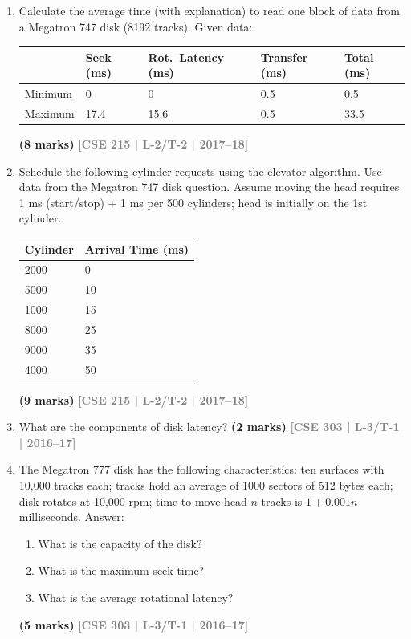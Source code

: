 \documentclass[12pt,a3paper]{article}
\newcommand{\yr}[1]{\hfill\textcolor{gray}{\small\textbf{[#1]}}}
\newcommand{\mk}[1]{\textcolor{orange!70!black}{\small\textbf{(#1 marks)}}}
\begin{document}
\begin{enumerate}
\item Calculate the average time (with explanation) to read one block of data from a Megatron 747 disk (8192 tracks). Given data:

\medskip
\begin{center}
\begin{tabular}{lllll}
\toprule
 & \textbf{Seek (ms)} & \textbf{Rot.\ Latency (ms)} & \textbf{Transfer (ms)} & \textbf{Total (ms)}\\
\midrule
Minimum & 0 & 0 & 0.5 & 0.5\\
Maximum & 17.4 & 15.6 & 0.5 & 33.5\\
\bottomrule
\end{tabular}
\end{center}
  \mk{8} \yr{CSE 215 | L-2/T-2 | 2017--18}

\item Schedule the following cylinder requests using the elevator algorithm. Use data from the Megatron 747 disk question. Assume moving the head requires 1 ms (start/stop) + 1 ms per 500 cylinders; head is initially on the 1st cylinder.

\medskip
\begin{center}
\begin{tabular}{ll}
\toprule
\textbf{Cylinder} & \textbf{Arrival Time (ms)}\\
\midrule
2000 & 0\\
5000 & 10\\
1000 & 15\\
8000 & 25\\
9000 & 35\\
4000 & 50\\
\bottomrule
\end{tabular}
\end{center}
  \mk{9} \yr{CSE 215 | L-2/T-2 | 2017--18}

\item What are the components of disk latency?
\mk{2} \yr{CSE 303 | L-3/T-1 | 2016--17}

\item The Megatron 777 disk has the following characteristics: ten surfaces with 10,000 tracks each; tracks hold an average of 1000 sectors of 512 bytes each; disk rotates at 10,000 rpm; time to move head $n$ tracks is $1 + 0.001n$ milliseconds. Answer:
\begin{enumerate}
  \item What is the capacity of the disk?
  \item What is the maximum seek time?
  \item What is the average rotational latency?
\end{enumerate}
\mk{5} \yr{CSE 303 | L-3/T-1 | 2016--17}


\end{enumerate}
\end{document}
